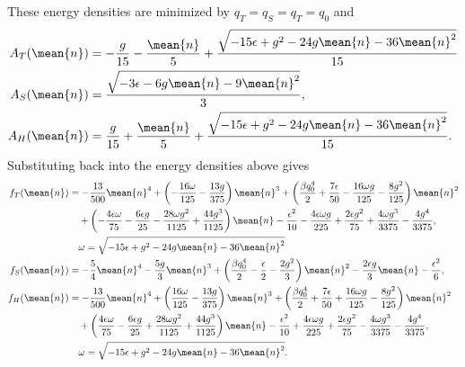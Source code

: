 %
These energy densities are minimized by $q_T = q_S = q_T = q_0$ and
%
\begin{subequations}
\begin{align}
A_T(\mean{n}) &= -\frac{g}{15} - \frac{\mean{n}}{5} + \frac{\sqrt{-15 \epsilon + g^2 - 24 g \mean{n} - 36 \mean{n}^2}}{15} \label{eqn-std-pfc-A-min-triangle} \\
A_S(\mean{n}) &= \frac{\sqrt{-3 \epsilon - 6 g \mean{n} - 9 \mean{n}^2}}{3},  \label{eqn-std-pfc-A-min-stripe}\\
A_H(\mean{n}) &= \frac{g}{15} + \frac{\mean{n}}{5} + \frac{\sqrt{-15 \epsilon + g^2 - 24 g \mean{n} - 36 \mean{n}^2}}{15}. \label{eqn-std-pfc-A-min-honeycomb}
\end{align}
\end{subequations}
%
Substituting back into the energy densities above gives
%
\begin{subequations}
\begin{align}
f_T(\mean{n}) &= - \frac{13}{500} \mean{n}^{4} + \left(- \frac{16 \omega}{125} - \frac{13 g}{375}\right) \mean{n}^{3} + \left(\frac{\beta q_{0}^{4}}{2} + \frac{7 \epsilon}{50} - \frac{16 \omega g}{125} - \frac{8 g^{2}}{125}\right) \mean{n}^{2} \nonumber \\
& \quad + \left(- \frac{4 \epsilon \omega}{75} - \frac{6 \epsilon g}{25} - \frac{28 \omega g^{2}}{1125} + \frac{44 g^{3}}{1125}\right) \mean{n} - \frac{\epsilon^{2}}{10} - \frac{4 \epsilon \omega g}{225} + \frac{2 \epsilon g^{2}}{75} + \frac{4 \omega g^{3}}{3375} - \frac{4 g^{4}}{3375}, \nonumber \\
& \quad \omega = \sqrt{-15 \epsilon + g^2 - 24 g \mean{n} -36 \mean{n}^2} \\
%
f_S(\mean{n}) &= - \frac{5}{4} \mean{n}^4 - \frac{5 g}{3} \mean{n}^3 + \left( \frac{\beta q_0^4}{2} - \frac{\epsilon}{2} - \frac{2 g^2}{3} \right) \mean{n}^2 - \frac{2 \epsilon g}{3} \mean{n} - \frac{\epsilon^2}{6}, \\
%
f_H(\mean{n}) &= - \frac{13}{500} \mean{n}^{4} + \left(\frac{16 \omega}{125} - \frac{13 g}{375}\right) \mean{n}^{3} + \left(\frac{\beta q_{0}^{4}}{2} + \frac{7 \epsilon}{50} + \frac{16 \omega g}{125} - \frac{8 g^{2}}{125}\right) \mean{n}^{2} \nonumber \\
& \quad + \left(\frac{4 \epsilon \omega}{75} - \frac{6 \epsilon g}{25} + \frac{28 \omega g^{2}}{1125} + \frac{44 g^{3}}{1125}\right) \mean{n} - \frac{\epsilon^{2}}{10} + \frac{4 \epsilon \omega g}{225} + \frac{2 \epsilon g^{2}}{75} - \frac{4 \omega g^{3}}{3375} - \frac{4 g^{4}}{3375}, \nonumber \\
& \quad \omega = \sqrt{-15 \epsilon + g^2 - 24 g \mean{n} -36 \mean{n}^2}.
\end{align}
\end{subequations}
